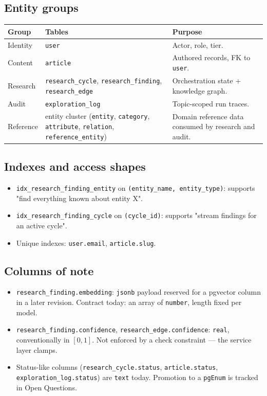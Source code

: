 \subsection{Entity groups}

\begin{center}
\small
\begin{tabular}{@{}lll@{}}
\toprule
Group & Tables & Purpose \\
\midrule
Identity   & \texttt{user}                                    & Actor, role, tier. \\
Content    & \texttt{article}                                 & Authored records, FK to \texttt{user}. \\
Research   & \texttt{research\_cycle}, \texttt{research\_finding}, \texttt{research\_edge} & Orchestration state + knowledge graph. \\
Audit      & \texttt{exploration\_log}                        & Topic-scoped run traces. \\
Reference  & entity cluster (\texttt{entity}, \texttt{category}, \texttt{attribute}, \texttt{relation}, \texttt{reference\_entity}) & Domain reference data consumed by research and audit. \\
\bottomrule
\end{tabular}
\end{center}

\subsection{Indexes and access shapes}
\begin{itemize}[leftmargin=1.2em]
  \item \texttt{idx\_research\_finding\_entity} on \texttt{(entity\_name, entity\_type)}:
        supports "find everything known about entity X".
  \item \texttt{idx\_research\_finding\_cycle} on \texttt{(cycle\_id)}:
        supports "stream findings for an active cycle".
  \item Unique indexes: \texttt{user.email}, \texttt{article.slug}.
\end{itemize}

\subsection{Columns of note}
\begin{itemize}[leftmargin=1.2em]
  \item \texttt{research\_finding.embedding}: \texttt{jsonb} payload reserved for
        a pgvector column in a later revision. Contract today: an array of
        \texttt{number}, length fixed per model.
  \item \texttt{research\_finding.confidence}, \texttt{research\_edge.confidence}:
        \texttt{real}, conventionally in \([0, 1]\). Not enforced by a check
        constraint --- the service layer clamps.
  \item Status-like columns (\texttt{research\_cycle.status},
        \texttt{article.status}, \texttt{exploration\_log.status}) are \texttt{text}
        today. Promotion to a \texttt{pgEnum} is tracked in Open Questions.
\end{itemize}

